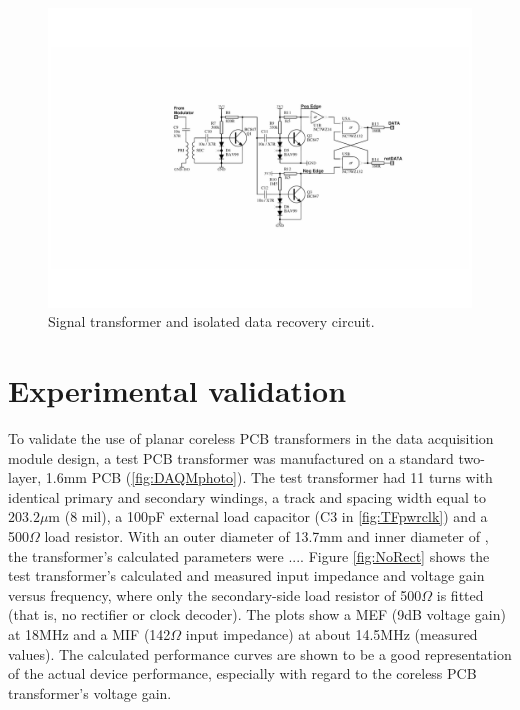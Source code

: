 \documentclass[conference]{IEEEtran}
\begin{document}
	\begin{figure}[t]
		\centering
		\includegraphics[width=1.0\textwidth]{./img/TFdat_BW}
		\caption{Signal transformer and isolated data recovery circuit.}
		\label{fig:TFdat}
	\end{figure}
	
\section{Experimental validation}
To validate the use of planar coreless PCB transformers in the data acquisition module design, a test PCB transformer was manufactured on a standard two-layer, 1.6mm PCB (\ref{fig:DAQMphoto}).  The test transformer had 11 turns with identical primary and secondary windings, a track and spacing width equal to $ 203.2\mu $m (8 mil), a 100pF external load capacitor (C3 in \ref{fig:TFpwrclk}) and a 500$\Omega$ load resistor.  With an outer diameter of 13.7mm and inner diameter of , the transformer's calculated parameters were
....
Figure \ref{fig:NoRect} shows the test transformer's calculated and measured input impedance and voltage gain versus frequency, where only the secondary-side load resistor of 500$\Omega$ is fitted (that is, no rectifier or clock decoder).  The plots show a MEF (9dB voltage gain) at 18MHz and a MIF (142$\Omega$ input impedance) at about 14.5MHz (measured values).  The calculated performance curves are shown to be a good representation of the actual device performance, especially with regard to the coreless PCB transformer's voltage gain.
\end{document}
